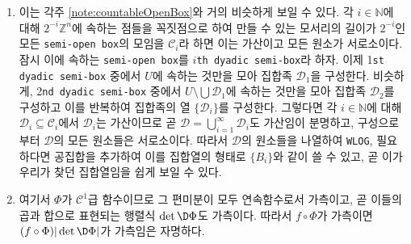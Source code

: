 \begin{enumerate}[label = \textsf{\textbf{\arabic*}}]
    \item 이는 각주 \ref{note:countableOpenBox}와 거의 비슷하게 보일 수 있다. 각 $i\in\mathbb{N}$에 대해 $2^{-i}\mathbb{Z}^n$에 속하는 점들을 꼭짓점으로 하여 만들 수 있는 모서리의 길이가 $2^{-i}$인 모든 \texttt{semi-open box}의 모임을 $\mathcal{C}_i$라 하면 이는 가산이고 모든 원소가 서로소이다. 잠시 이에 속하는 \texttt{semi-open box}를 $i$\texttt{th dyadic semi-box}라 하자. 이제 1\texttt{st dyadic semi-box} 중에서 $U$에 속하는 것만을 모아 집합족 $\mathcal{D}_1$을 구성한다. 비슷하게, 2\texttt{nd dyadic semi-box} 중에서 $U\setminus\bigcup\mathcal{D}_1$에 속하는 것만을 모아 집합족 $\mathcal{D}_2$를 구성하고 이를 반복하여 집합족의 열 $\{\mathcal{D}_i\}$를 구성한다. 그렇다면 각 $i\in\mathbb{N}$에 대해 $\mathcal{D}_i\subseteq\mathcal{C}_i$에서 $\mathcal{D}_i$는 가산이므로 곧 $\mathcal{D}=\bigcup_{i=1}^\infty\mathcal{D}_i$도 가산임이 분명하고, 구성으로부터 $\mathcal{D}$의 모든 원소들은 서로소이다. 따라서 $\mathcal{D}$의 원소들을 나열하여 \texttt{WLOG}, 필요하다면 공집합을 추가하여 이를 집합열의 형태로 $\{B_i\}$와 같이 쓸 수 있고, 곧 이가 우리가 찾던 집합열임을 쉽게 보일 수 있다.
    \item 여기서 $\Phi$가 $\mathcal{C}^1$급 함수이므로 그 편미분이 모두 연속함수로서 가측이고, 곧 이들의 곱과 합으로 표현되는 행렬식 $\det\D\Phi$도 가측이다. 따라서 $f\circ\Phi$가 가측이면 $(f\circ\Phi)|\det\D\Phi|$가 가측임은 자명하다.


\end{enumerate}
